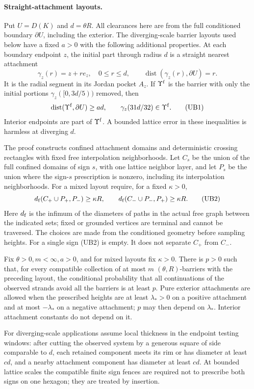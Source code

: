 \paragraph{Straight-attachment layouts.}
Put \(U=D(K)\) and \(d=\theta R\).  All clearances here are from the
full conditioned boundary \(\partial U\), including the exterior.
The diverging-scale barrier layouts used below have a fixed \(a>0\)
with the following additional properties.  At each boundary endpoint
\(z\), the initial part through radius \(d\) is a straight nearest
attachment
\[
 \gamma_z(r)=z+r e_z,\quad 0\le r\le d,\qquad
 \operatorname{dist}(\gamma_z(r),\partial U)=r.
\]
It is the radial segment in its Jordan pocket \(A_z\).  If
\(\Upsilon^{\rm f}\) is the barrier with only the initial portions
\(\gamma_z([0,3d/5))\) removed, then
\[
 \operatorname{dist}(\Upsilon^{\rm f},\partial U)\ge ad,\qquad
 \gamma_z(31d/32)\in\Upsilon^{\rm f}.                            \tag{UB1}
\]
Interior endpoints are part of \(\Upsilon^{\rm f}\).  A bounded
lattice error in these inequalities is harmless at diverging \(d\).

The proof constructs confined attachment domains and deterministic
crossing rectangles with fixed free interpolation neighborhoods.
Let \(C_s\) be the union of the full confined domains of sign \(s\),
with one lattice neighbor layer, and let \(P_s\) be the union where
the sign-\(s\) prescription is nonzero, including its interpolation
neighborhoods.  For a mixed layout require, for a fixed \(\kappa>0\),
\[
 d_{\rm f}(C_+\cup P_+,P_-)\ge\kappa R,\qquad
 d_{\rm f}(C_-\cup P_-,P_+)\ge\kappa R.                          \tag{UB2}
\]
Here \(d_{\rm f}\) is the infimum of the diameters of paths in the
actual free graph between the indicated sets; fixed or grounded
vertices are terminal and cannot be traversed.  The choices are made
from the conditioned geometry before sampling heights.  For a
single sign (UB2) is empty.  It does not separate \(C_+\) from \(C_-\).

\begin{proposition}
\label{g:barriers}
Fix \(\theta>0,m<\infty,a>0\), and for mixed layouts fix \(\kappa>0\).
There is \(p>0\) such that, for every compatible collection of at most
\(m\) \((\theta,R)\)-barriers with the preceding layout, the conditional
probability that all continuations of the observed strands avoid all
the barriers is at least \(p\).
Pure exterior attachments are allowed when the prescribed heights are
at least \(\lambda_*>0\) on a positive attachment and at most
\(-\lambda_*\) on a negative attachment; \(p\) may then depend on
\(\lambda_*\).  Interior attachment constants do not depend on it.

For diverging-scale applications assume local thickness in the endpoint
testing windows: after cutting the observed system by a generous square
of side comparable to \(d\), each retained component meets its rim or
has diameter at least \(cd\), and a nearby attachment component has
diameter at least \(cd\).  At bounded lattice scales the compatible
finite sign fences are required not to prescribe both signs on one
hexagon; they are treated by insertion.
\end{proposition}

